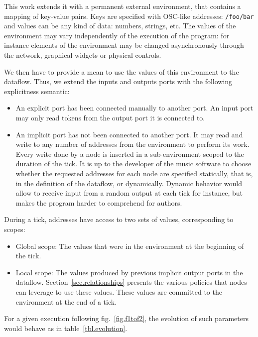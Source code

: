 \documentclass{article}
\begin{document}
This work extends it with a permanent external environment, that contains a mapping of key-value pairs.
Keys are specified with OSC-like\cite{Freed09featuresand} addresses: \lstinline|/foo/bar| and values can be any kind of data: numbers, strings, etc. 
The values of the environment may vary independently of the execution of the program: for instance elements of the environment may be changed asynchronously through the network, graphical widgets or physical controls.
    
We then have to provide a mean to use the values of this environment to the dataflow.
Thus, we extend the inputs and outputs ports with the following explicitness semantic: 
    
\begin{itemize}
  \item An explicit port has been connected manually to another port.
        An input port may only read tokens from the output port it is connected to.
  \item An implicit port has not been connected to another port. 
        It may read and write to any number of addresses from the environment to perform its work.
        Every write done by a node is inserted in a sub-environment scoped to the duration of the tick.
        It is up to the developer of the music software to choose whether the requested addresses for each node are specified statically, that is, in the definition of the dataflow, or dynamically.
        Dynamic behavior would allow to receive input from a random output at each tick for instance, but makes the program harder to comprehend for authors.
\end{itemize}
    
During a tick, addresses have access to two sets of values, corresponding to scopes: 
\begin{itemize}
  \item Global scope: The values that were in the environment at the beginning of the tick.
  \item Local scope: The values produced by previous implicit output ports in the dataflow.
        Section~\ref{sec.relationships} presents the various policies that nodes can leverage to 
        use these values. 
        These values are committed to the environment at the end of a tick.
\end{itemize}

For a given execution following fig.~\ref{fig.f1tof2}, the evolution of such parameters would behave as in table~\ref{tbl.evolution}.
\end{document}
